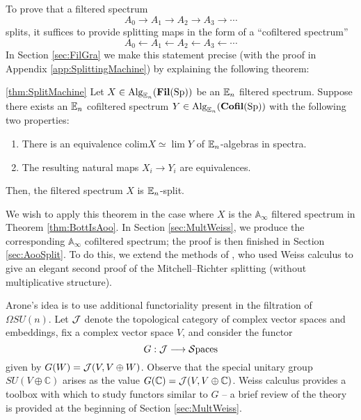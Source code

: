 To prove that a filtered spectrum
$$A_0 \longrightarrow A_1 \longrightarrow A_2 \longrightarrow A_3 \longrightarrow \cdots$$
splits, it suffices to provide splitting maps in the form of a ``cofiltered spectrum''
$$A_0 \longleftarrow A_1 \longleftarrow A_2 \longleftarrow A_3 \longleftarrow \cdots$$
In Section \ref{sec:FilGra} we make this statement precise (with the proof in Appendix \ref{app:SplittingMachine}) by explaining the following theorem:

\begin{customthm}{\ref{thm:SplitMachine}}%
Let $X\in \operatorname{\mathrm{Alg}}_{\operatorname{\mathbb{E}}_n}(\operatorname{\mathbf{Fil}}(\operatorname{\mathrm{Sp}}))$ be an $\operatorname{\mathbb{E}}_n$ filtered spectrum.  Suppose there exists an $\operatorname{\mathbb{E}}_n$ cofiltered spectrum $Y\in \operatorname{\mathrm{Alg}}_{\operatorname{\mathbb{E}}_n}(\operatorname{\mathbf{Cofil}}(\operatorname{\mathrm{Sp}}))$ with the following two properties:
\begin{enumerate}
\item There is an equivalence $\mathrm{colim } X \simeq \lim Y$ of $\operatorname{\mathbb{E}}_n$-algebras in spectra.
\item The resulting natural maps $X_i \to Y_i$ are equivalences.  
\end{enumerate}
Then, the filtered spectrum $X$ is $\operatorname{\mathbb{E}}_n$-split.
\end{customthm}

We wish to apply this theorem in the case where $X$ is the $\mathbb{A}_\infty$ filtered spectrum in Theorem \ref{thm:BottIsAoo}.  In Section \ref{sec:MultWeiss}, we produce the corresponding $\mathbb{A}_\infty$ cofiltered spectrum; the proof is then finished in Section \ref{sec:AooSplit}.  To do this, we extend the methods of \cite{Arone}, who used Weiss calculus to give an elegant second proof of the Mitchell--Richter splitting (without multiplicative structure).  

Arone's idea is to use additional functoriality present in the filtration of $\Omega SU(n)$.  Let $\operatorname{\mathcal{J}}$ denote the topological category of complex vector spaces and embeddings, fix a complex vector space $V$, and consider the functor $$G:\operatorname{\mathcal{J}} \longrightarrow \mathcal{S}\text{paces}$$
given by $G(W)=\operatorname{\mathcal{J}}(V,V \oplus W)$.  Observe that the special unitary group $SU(V \oplus \mathbb{C})$ arises as the value $G(\mathbb{C}) = \operatorname{\mathcal{J}} (V,V\oplus \mathbb{C})$.  Weiss calculus provides a toolbox with which to study functors similar to $G$ -- a brief review of the theory is provided at the beginning of Section \ref{sec:MultWeiss}.  %

